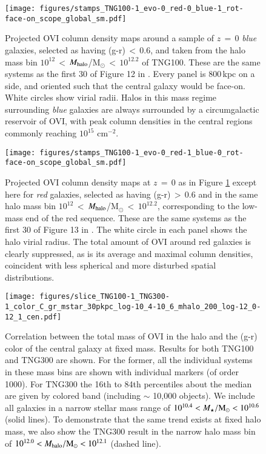 \documentclass[useAMS,usenatbib]{mnras}
\newcommand{\ovi}{OVI\xspace}
\newcommand{\gr}{\mbox{(g-r)}\xspace}
\begin{document}
\begin{figure*}
\centerline{\texttt{[image: figures/stamps\_TNG100-1\_evo-0\_red-0\_blue-1\_rot-face-on\_scope\_global\_sm.pdf]}}
\caption{ Projected \ovi column density maps around a sample of $z\,=\,0$ \textit{blue} galaxies, selected as having (g-r)\,$<$\,0.6, and taken from the halo mass bin \mbox{$10^{12}$\,$<$\,$M_{\rm halo}$/M$_\odot$\,$<$\,$10^{12.2}$} of TNG100. These are the same systems as the first 30 of Figure 12 in \protect\cite{nelson18}. Every panel is 800\,kpc on a side, and oriented such that the central galaxy would be face-on. White circles show virial radii. Halos in this mass regime surrounding \textit{blue} galaxies are always surrounded by a circumgalactic reservoir of \ovi, with peak column densities in the central regions commonly reaching $10^{15}$ cm$^{-2}$.
 \label{fig_stamps_blue}} 
\end{figure*}

\begin{figure*}
\centerline{\texttt{[image: figures/stamps\_TNG100-1\_evo-0\_red-1\_blue-0\_rot-face-on\_scope\_global\_sm.pdf]}}
\caption{ Projected \ovi column density maps at $z\,=\,0$ as in Figure \ref{fig_stamps_blue} except here for \textit{red} galaxies, selected as having (g-r)\,$>$\,0.6 and in the same halo mass bin \mbox{$10^{12}$\,$<$\,$M_{\rm halo}$/M$_\odot$\,$<$\,$10^{12.2}$}, corresponding to the low-mass end of the red sequence. These are the same systems as the first 30 of Figure 13 in \protect\cite{nelson18}. The white circle in each panel shows the halo virial radius. The total amount of \ovi around red galaxies is clearly suppressed, as is its average and maximal column densities, coincident with less spherical and more disturbed spatial distributions.
 \label{fig_stamps_red}} 
\end{figure*}

\begin{figure}
\centering
\texttt{[image: figures/slice\_TNG100-1\_TNG300-1\_color\_C\_gr\_mstar\_30pkpc\_log-10\_4-10\_6\_mhalo\_200\_log-12\_0-12\_1\_cen.pdf]}
\caption{ Correlation between the total mass of \ovi in the halo and the \gr color of the central galaxy at fixed mass. Results for both TNG100 and TNG300 are shown. For the former, all the individual systems in these mass bins are shown with individual markers (of order 1000). For TNG300 the 16th to 84th percentiles about the median are given by colored band (including $\sim$ 10,000 objects). We include all galaxies in a narrow stellar mass range of $10^{10.4} < M_\star / \rm{M}_\odot < 10^{10.6}$ (solid lines). To demonstrate that the same trend exists at fixed halo mass, we also show the TNG300 result in the narrow halo mass bin of $10^{12.0} < M_{\rm halo} / \rm{M}_\odot < 10^{12.1}$ (dashed line).
 \label{fig_slice_color}}
\end{figure}
\end{document}
